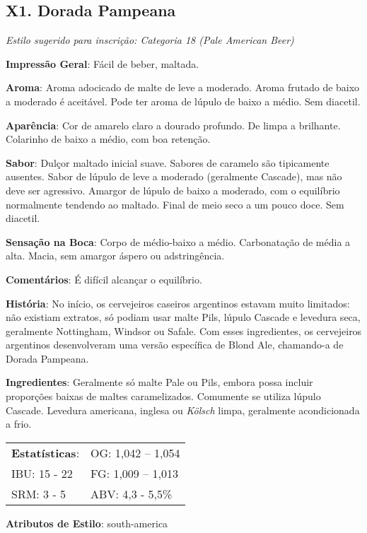 \subsection*{X1. Dorada Pampeana}

\textit{Estilo sugerido para inscrição: Categoria 18 (Pale American Beer)}

\textbf{Impressão Geral}: Fácil de beber, maltada.

\textbf{Aroma}: Aroma adocicado de malte de leve a moderado. Aroma frutado de baixo a moderado é aceitável. Pode ter aroma de lúpulo de baixo a médio. Sem diacetil.

\textbf{Aparência}: Cor de amarelo claro a dourado profundo. De limpa a brilhante. Colarinho de baixo a médio, com boa retenção.

\textbf{Sabor}: Dulçor maltado inicial suave. Sabores de caramelo são tipicamente ausentes. Sabor de lúpulo de leve a moderado (geralmente Cascade), mas não deve ser agressivo. Amargor de lúpulo de baixo a moderado, com o equilíbrio normalmente tendendo ao maltado. Final de meio seco a um pouco doce. Sem diacetil.

\textbf{Sensação na Boca}: Corpo de médio-baixo a médio. Carbonatação de média a alta. Macia, sem amargor áspero ou adstringência.

\textbf{Comentários}: É difícil alcançar o equilíbrio.

\textbf{História}: No início, os cervejeiros caseiros argentinos estavam muito limitados: não existiam extratos, só podiam usar malte Pils, lúpulo Cascade e levedura seca, geralmente Nottingham, Windsor ou Safale. Com esses ingredientes, os cervejeiros argentinos desenvolveram uma versão específica de Blond Ale, chamando-a de Dorada Pampeana.

\textbf{Ingredientes}: Geralmente só malte Pale ou Pils, embora possa incluir proporções baixas de maltes caramelizados. Comumente se utiliza lúpulo Cascade. Levedura americana, inglesa ou \textit{Kölsch} limpa, geralmente acondicionada a frio.

\begin{tabular}{@{}p{35mm}p{35mm}@{}}
  \textbf{Estatísticas}: & OG: 1,042 – 1,054 \\
  IBU: 15 - 22 & FG: 1,009 – 1,013 \\
  SRM: 3 - 5 & ABV: 4,3 - 5,5\%
\end{tabular}

\textbf{Atributos de Estilo}: south-america